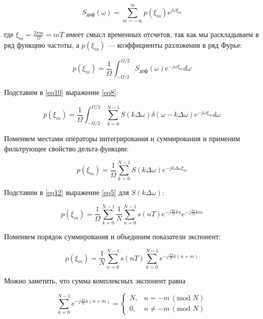\begin{equation}
\label{eq9}
S_{\text{дпф}}(\omega) = \sum_{m=-\infty}^{\infty} p(\xi_m) e^{j\omega \xi_m} \tag{2.8}
\end{equation}

где \( \xi_m = \frac{2\pi m}{\Omega} = mT \) имеет смысл временных отсчетов, так как мы раскладываем в ряд функцию частоты, а \( p(\xi_m) \) — коэффициенты разложения в ряд Фурье:

\begin{equation}
\label{eq10}
p(\xi_m) = \frac{1}{\Omega} \int_{-\Omega/2}^{\Omega/2} S_{\text{дпф}}(\omega) e^{-j\omega \xi_m} d\omega \tag{2.9}
\end{equation}

Подставим в \eqref{eq10} выражение \eqref{eq8}:

\begin{equation}
\label{eq11}
p(\xi_m) = \frac{1}{\Omega} \int_{-\Omega/2}^{\Omega/2} \sum_{k=0}^{N-1} S(k \Delta \omega) \delta(\omega - k\Delta \omega) e^{-j\omega \xi_m} d\omega \tag{2.10}
\end{equation}

Поменяем местами операторы интегрирования и суммирования и применим фильтрующее свойство дельта-функции:

\begin{equation}
\label{eq12}
p(\xi_m) = \frac{1}{\Omega} \sum_{k=0}^{N-1} S(k \Delta \omega) e^{-jk\Delta \omega \xi_m} \tag{2.11}
\end{equation}

Подставим в \eqref{eq12} выражение \eqref{eq5} для \( S(k \Delta \omega) \):

\begin{equation}
\label{eq13}
p(\xi_m) = \frac{1}{\Omega} \sum_{k=0}^{N-1} \frac{1}{N} \sum_{n=0}^{N-1} s(nT) e^{-j\frac{2\pi}{N}kn} e^{-j\frac{2\pi}{N}km} \tag{2.12}
\end{equation}

Поменяем порядок суммирования и объединим показатели экспонент:

\begin{equation}
\label{eq14}
p(\xi_m) = \frac{1}{N} \sum_{n=0}^{N-1} s(nT) \sum_{k=0}^{N-1} e^{-j\frac{2\pi}{N}k(n+m)} \tag{2.13}
\end{equation}

Можно заметить, что сумма комплексных экспонент равна

\begin{equation}
\label{eq15}
\sum_{k=0}^{N-1} e^{-j\frac{2\pi}{N}k(n+m)} =
\begin{cases} 
N, & n = -m \, (\text{mod } N) \\
0, & n \neq -m \, (\text{mod } N) \tag{2.14}
\end{cases}
\end{equation}

